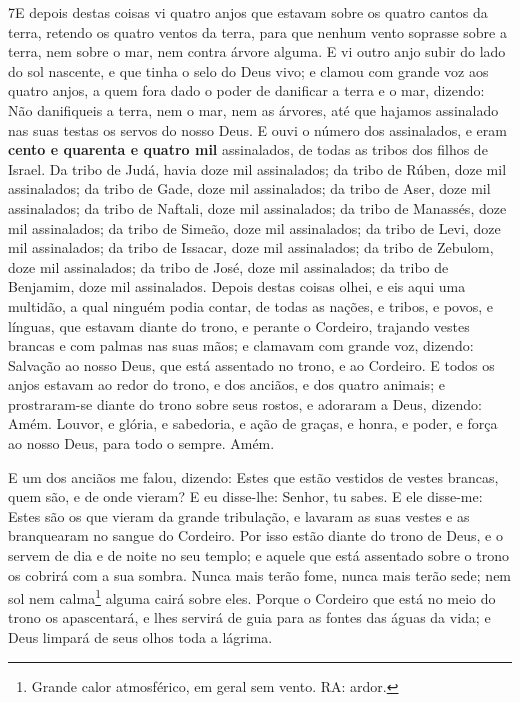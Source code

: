 \lettrine{7} E depois destas coisas vi quatro anjos que
estavam sobre os quatro cantos da terra, retendo os quatro ventos da
terra, para que nenhum vento soprasse sobre a terra, nem sobre o
mar, nem contra árvore alguma. E vi outro anjo subir do lado do
sol nascente, e que tinha o selo do Deus vivo; e clamou com grande
voz aos quatro anjos, a quem fora dado o poder de danificar a terra
e o mar, dizendo: Não danifiqueis a terra, nem o mar, nem as
árvores, até que hajamos assinalado nas suas testas os servos do
nosso Deus. E ouvi o número dos assinalados, e eram
\textbf{cento e quarenta e quatro mil} assinalados, de todas as
tribos dos filhos de Israel. Da tribo de Judá, havia doze mil
assinalados; da tribo de Rúben, doze mil assinalados; da tribo de
Gade, doze mil assinalados; da tribo de Aser, doze mil
assinalados; da tribo de Naftali, doze mil assinalados; da tribo de
Manassés, doze mil assinalados; da tribo de Simeão, doze mil
assinalados; da tribo de Levi, doze mil assinalados; da tribo de
Issacar, doze mil assinalados; da tribo de Zebulom, doze mil
assinalados; da tribo de José, doze mil assinalados; da tribo de
Benjamim, doze mil assinalados. Depois destas coisas olhei, e
eis aqui uma multidão, a qual ninguém podia contar, de todas as
nações, e tribos, e povos, e línguas, que estavam diante do trono, e
perante o Cordeiro, trajando vestes brancas e com palmas nas suas
mãos; e clamavam com grande voz, dizendo: Salvação ao nosso
Deus, que está assentado no trono, e ao Cordeiro. E todos os
anjos estavam ao redor do trono, e dos anciãos, e dos quatro
animais; e prostraram-se diante do trono sobre seus rostos, e
adoraram a Deus, dizendo: Amém. Louvor, e glória, e
sabedoria, e ação de graças, e honra, e poder, e força ao nosso
Deus, para todo o sempre. Amém.

E um dos anciãos me falou, dizendo: Estes que estão vestidos de
vestes brancas, quem são, e de onde vieram? E eu disse-lhe:
Senhor, tu sabes. E ele disse-me: Estes são os que vieram da grande
tribulação, e lavaram as suas vestes e as branquearam no sangue do
Cordeiro. Por isso estão diante do trono de Deus, e o servem
de dia e de noite no seu templo; e aquele que está assentado sobre o
trono os cobrirá com a sua sombra. Nunca mais terão fome,
nunca mais terão sede; nem sol nem calma\footnote{Grande calor
atmosférico, em geral sem vento. RA: ardor.} alguma cairá sobre
eles. Porque o Cordeiro que está no meio do trono os
apascentará, e lhes servirá de guia para as fontes das águas da
vida; e Deus limpará de seus olhos toda a lágrima.

